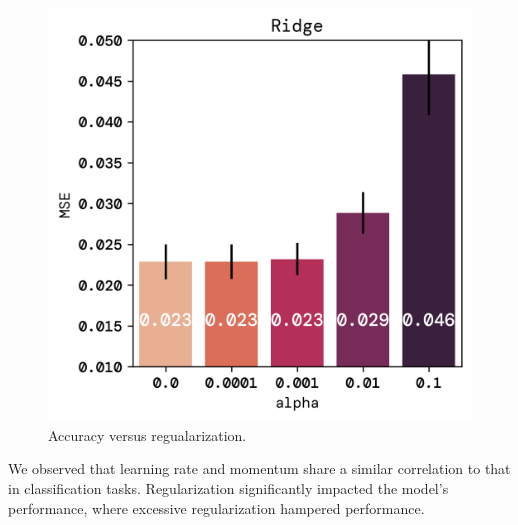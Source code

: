 \documentclass[twoside,11pt]{report}
\begin{document}
\begin{figure}[!ht]
\begin{minipage}[t]{0.5\textwidth - 1mm}
\begin{center}
                \includegraphics[width=\textwidth]{../runsAndFigures/MSE_alpha.png}
            \end{center}
            \caption
            {
                Accuracy versus regualarization.
            }\label{fig:MSE_aplha}
        \end{minipage}
    \end{figure}

    \noindent
    We observed that learning rate and momentum share a similar correlation to that in classification tasks. 
    Regularization significantly impacted the model's performance, where excessive regularization 
    hampered performance.\\
\end{document}
